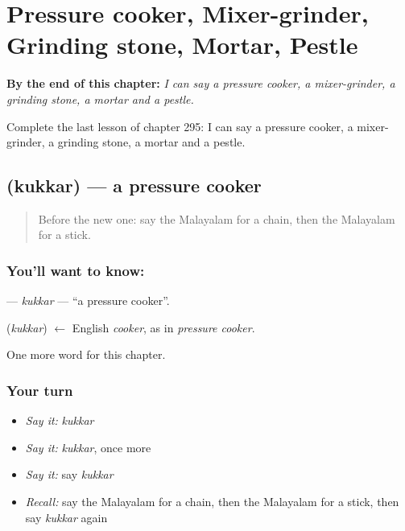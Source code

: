
\chapter{Pressure cooker, Mixer-grinder, Grinding stone, Mortar, Pestle}
\label{ch:ml-pressure-cooker-mixer-grinder-grinding-stone-mortar-pestle}

\begin{chapteropening}
\textbf{By the end of this chapter:} \emph{I can say a pressure cooker, a mixer-grinder, a grinding stone, a mortar and a pestle.}

Complete the last lesson of chapter 295: I can say a pressure cooker, a mixer-grinder, a grinding stone, a mortar and a pestle.
\end{chapteropening}

\section[\texorpdfstring{\ml{കുക്കർ} (kukkar)}{കുക്കർ (kukkar)}]{ (kukkar) — a pressure cooker}

\label{lesson:ML-C295-kukkar}



\begin{quote}
Before the new one: say the Malayalam for a chain, then the Malayalam for a stick.
\end{quote}

\subsection*{You'll want to know: }
\textbf{} — \emph{kukkar} — \textquotedblleft{}a pressure cooker\textquotedblright{}.

\begin{cousinweb}
\textbf{} (\emph{kukkar}) $\leftarrow$ English \emph{cooker}, as in \emph{pressure cooker}.
\end{cousinweb}

\begin{grammarlens}[title={What you've built}]
One more word for this chapter.
\end{grammarlens}

\subsection*{Your turn}
\begin{itemize}
\raggedright
  \item \emph{Say it:} \emph{kukkar}
  \item \emph{Say it:} \emph{kukkar}, once more
  \item \emph{Say it:} say \emph{kukkar}
  \item \emph{Recall:} say the Malayalam for a chain, then the Malayalam for a stick, then say \emph{kukkar} again
\end{itemize}

